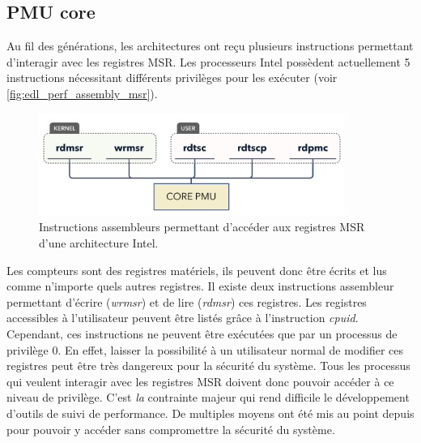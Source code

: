     \subsection{PMU core} \label{sec:perf_asm_msr}

        Au fil des générations, les architectures ont reçu plusieurs instructions permettant d'interagir avec les registres MSR. Les processeurs Intel possèdent actuellement 5 instructions nécessitant différents privilèges pour les exécuter (voir \autoref{fig:edl_perf_assembly_msr}).
        
        \begin{figure}[h!]
            \center
            \includegraphics[width=10cm]{images/edl_perf_assembly_msr.png}
            \caption{\label{fig:edl_perf_assembly_msr} Instructions assembleurs permettant d'accéder aux registres MSR d'une architecture Intel.}
        \end{figure}
    
    
        Les compteurs sont des registres matériels, ils peuvent donc être écrits et lus comme n'importe quels autres registres. Il existe deux instructions assembleur permettant d'écrire (\textit{wrmsr}) et de lire (\textit{rdmsr}) ces registres. Les registres accessibles à l'utilisateur peuvent être listés grâce à l'instruction \textit{cpuid}. Cependant, ces instructions ne peuvent être exécutées que par un processus de privilège 0. En effet, laisser la possibilité à un utilisateur normal de modifier ces registres peut être très dangereux pour la sécurité du système. Tous les processus qui veulent interagir avec les registres MSR doivent donc pouvoir accéder à ce niveau de privilège. C'est \textit{la} contrainte majeur qui rend difficile le développement d'outils de suivi de performance. De multiples moyens ont été mis au point depuis pour pouvoir y accéder sans compromettre la sécurité du système. 
        
